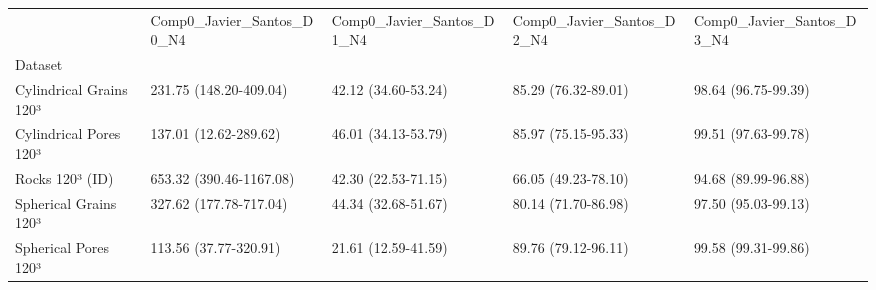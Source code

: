 \begin{tabular}{lllll}
\toprule
 & Comp0_Javier_Santos_D0_N4 & Comp0_Javier_Santos_D1_N4 & Comp0_Javier_Santos_D2_N4 & Comp0_Javier_Santos_D3_N4 \\
Dataset &  &  &  &  \\
\midrule
Cylindrical Grains 120³ & 231.75 (148.20-409.04) & 42.12 (34.60-53.24) & 85.29 (76.32-89.01) & 98.64 (96.75-99.39) \\
Cylindrical Pores 120³ & 137.01 (12.62-289.62) & 46.01 (34.13-53.79) & 85.97 (75.15-95.33) & 99.51 (97.63-99.78) \\
Rocks 120³ (ID) & 653.32 (390.46-1167.08) & 42.30 (22.53-71.15) & 66.05 (49.23-78.10) & 94.68 (89.99-96.88) \\
Spherical Grains 120³ & 327.62 (177.78-717.04) & 44.34 (32.68-51.67) & 80.14 (71.70-86.98) & 97.50 (95.03-99.13) \\
Spherical Pores 120³ & 113.56 (37.77-320.91) & 21.61 (12.59-41.59) & 89.76 (79.12-96.11) & 99.58 (99.31-99.86) \\
\bottomrule
\end{tabular}
